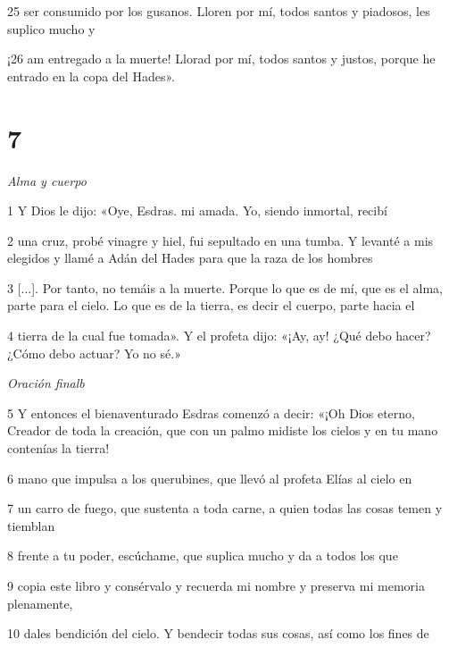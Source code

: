 \par 25 ser consumido por los gusanos. Lloren por mí, todos santos y piadosos, les suplico mucho y

\par ¡26 am entregado a la muerte! Llorad por mí, todos santos y justos, porque he entrado en la copa del Hades».

\chapter{7}

\par \textit{Alma y cuerpo}

\par 1 Y Dios le dijo: «Oye, Esdras. mi amada. Yo, siendo inmortal, recibí

\par 2 una cruz, probé vinagre y hiel, fui sepultado en una tumba. Y levanté a mis elegidos y llamé a Adán del Hades para que la raza de los hombres

\par 3 [...]. Por tanto, no temáis a la muerte. Porque lo que es de mí, que es el alma, parte para el cielo. Lo que es de la tierra, es decir el cuerpo, parte hacia el

\par 4 tierra de la cual fue tomada». Y el profeta dijo: «¡Ay, ay! ¿Qué debo hacer? ¿Cómo debo actuar? Yo no sé.»

\par \textit{Oración finalb}

\par 5 Y entonces el bienaventurado Esdras comenzó a decir: «¡Oh Dios eterno, Creador de toda la creación, que con un palmo midiste los cielos y en tu mano contenías la tierra!

\par 6 mano que impulsa a los querubines, que llevó al profeta Elías al cielo en

\par 7 un carro de fuego, que sustenta a toda carne, a quien todas las cosas temen y tiemblan

\par 8 frente a tu poder, escúchame, que suplica mucho y da a todos los que

\par 9 copia este libro y consérvalo y recuerda mi nombre y preserva mi memoria plenamente,

\par 10 dales bendición del cielo. Y bendecir todas sus cosas, así como los fines de

